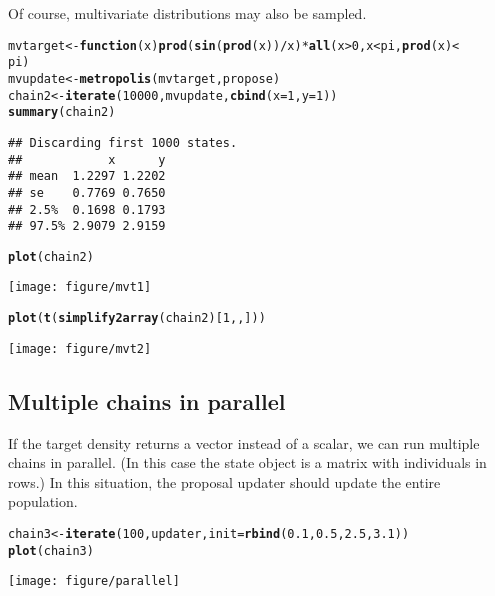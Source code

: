 \documentclass{article}\usepackage[]{graphicx}\usepackage[]{color}
\makeatletter
\def\maxwidth{ %
  \ifdim\Gin@nat@width>\linewidth
    \linewidth
  \else
    \Gin@nat@width
  \fi
}
\newcommand{\hlnum}[1]{\textcolor[rgb]{0.686,0.059,0.569}{#1}}%
\newcommand{\hlopt}[1]{\textcolor[rgb]{0,0,0}{#1}}%
\newcommand{\hlstd}[1]{\textcolor[rgb]{0.345,0.345,0.345}{#1}}%
\newcommand{\hlkwa}[1]{\textcolor[rgb]{0.161,0.373,0.58}{\textbf{#1}}}%
\newcommand{\hlkwb}[1]{\textcolor[rgb]{0.69,0.353,0.396}{#1}}%
\newcommand{\hlkwc}[1]{\textcolor[rgb]{0.333,0.667,0.333}{#1}}%
\newcommand{\hlkwd}[1]{\textcolor[rgb]{0.737,0.353,0.396}{\textbf{#1}}}%
\newenvironment{kframe}{%
 \def\at@end@of@kframe{}%
 \ifinner\ifhmode%
  \def\at@end@of@kframe{\end{minipage}}%
  \begin{minipage}{\columnwidth}%
 \fi\fi%
 \def\FrameCommand##1{\hskip\@totalleftmargin \hskip-\fboxsep
 \colorbox{shadecolor}{##1}\hskip-\fboxsep
     \hskip-\linewidth \hskip-\@totalleftmargin \hskip\columnwidth}%
 \MakeFramed {\advance\hsize-\width
   \@totalleftmargin\z@ \linewidth\hsize
   \@setminipage}}%
 {\par\unskip\endMakeFramed%
 \at@end@of@kframe}
\newenvironment{knitrout}{}{} %
\makeatother
\begin{document}
Of course, multivariate distributions may also be sampled. 
\begin{knitrout}
\color{fgcolor}\begin{kframe}
\begin{alltt}
\hlstd{mvtarget} \hlkwb{<-} \hlkwa{function}\hlstd{(}\hlkwc{x}\hlstd{)} \hlkwd{prod}\hlstd{(}\hlkwd{sin}\hlstd{(}\hlkwd{prod}\hlstd{(x))}\hlopt{/}\hlstd{x)} \hlopt{*} \hlkwd{all}\hlstd{(x} \hlopt{>} \hlnum{0}\hlstd{, x} \hlopt{<} \hlstd{pi,} \hlkwd{prod}\hlstd{(x)} \hlopt{<}
    \hlstd{pi)}
\hlstd{mvupdate} \hlkwb{<-} \hlkwd{metropolis}\hlstd{(mvtarget, propose)}
\hlstd{chain2} \hlkwb{<-} \hlkwd{iterate}\hlstd{(}\hlnum{10000}\hlstd{, mvupdate,} \hlkwd{cbind}\hlstd{(}\hlkwc{x} \hlstd{=} \hlnum{1}\hlstd{,} \hlkwc{y} \hlstd{=} \hlnum{1}\hlstd{))}
\hlkwd{summary}\hlstd{(chain2)}
\end{alltt}
\begin{verbatim}
## Discarding first 1000 states.
##            x      y
## mean  1.2297 1.2202
## se    0.7769 0.7650
## 2.5%  0.1698 0.1793
## 97.5% 2.9079 2.9159
\end{verbatim}
\begin{alltt}
\hlkwd{plot}\hlstd{(chain2)}
\end{alltt}
\end{kframe}
\texttt{[image: figure/mvt1]} 
\begin{kframe}\begin{alltt}
\hlkwd{plot}\hlstd{(}\hlkwd{t}\hlstd{(}\hlkwd{simplify2array}\hlstd{(chain2)[}\hlnum{1}\hlstd{, , ]))}
\end{alltt}
\end{kframe}
\texttt{[image: figure/mvt2]} 

\end{knitrout}


\subsection{Multiple chains in parallel}
If the target density returns a vector instead of a scalar, we can run
multiple chains in parallel. (In this case the state object is a
matrix with individuals in rows.) In this situation, the proposal
updater should update the entire population.
\begin{knitrout}
\color{fgcolor}\begin{kframe}
\begin{alltt}
\hlstd{chain3} \hlkwb{<-} \hlkwd{iterate}\hlstd{(}\hlnum{100}\hlstd{, updater,} \hlkwc{init} \hlstd{=} \hlkwd{rbind}\hlstd{(}\hlnum{0.1}\hlstd{,} \hlnum{0.5}\hlstd{,} \hlnum{2.5}\hlstd{,} \hlnum{3.1}\hlstd{))}
\hlkwd{plot}\hlstd{(chain3)}
\end{alltt}
\end{kframe}
\texttt{[image: figure/parallel]} 

\end{knitrout}
\end{document}
